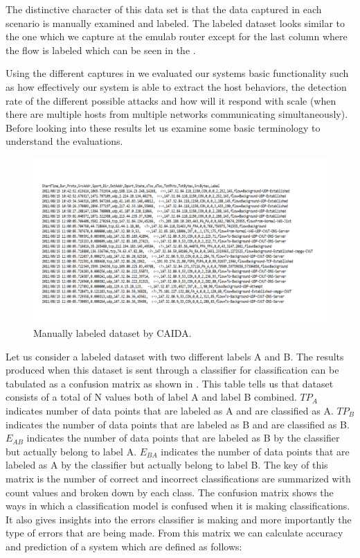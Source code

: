   The distinctive character of this data set is that the data captured in each scenario is manually examined and labeled. The labeled dataset looks similar to the one which we capture at the emulab router except for the last column where the flow is labeled which can be seen in the .

Using the different captures in   we evaluated our systems basic functionality such as how effectively our system is able to extract the host behaviors, the detection rate of the different possible attacks and how will it respond with scale (when there are multiple hosts from multiple networks communicating simultaneously). Before looking into these results let us examine some basic terminology to understand the evaluations.

\begin{figure}[b]
	\centerline{\includegraphics[trim=2cm 2cm 2cm 2cm, scale = 0.45]{ss_labeled.pdf}}
	\caption{Manually labeled dataset by CAIDA.}%
\end{figure}

Let us consider a labeled dataset with two different labels A and B. The results produced when this dataset is sent through a classifier for classification can be tabulated as a confusion matrix as shown in . This table tells us that dataset consists of a total of N values both of label A and label B combined. $TP_A$ indicates number of data points that are labeled as A and are classified as A. $TP_B$ indicates the number of data points that are labeled as B and are classified as B. $E_{AB}$ indicates the number of data points that are labeled as B by the classifier but actually belong to label A. $E_{BA}$ indicates the number of data points that are labeled as A by the classifier but actually belong to label B. The key of this matrix is the number of correct and incorrect classifications are summarized with count values and broken down by each class. The confusion matrix shows the ways in which a classification model is confused when it is making classifications. It also gives insights into the errors classifier is making and more importantly the type of errors that are being made. From this matrix we can calculate accuracy and prediction of a system which are defined as follows:

